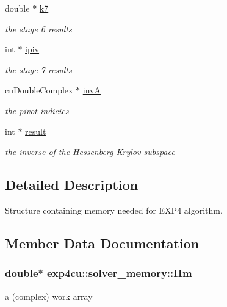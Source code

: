 \begin{DoxyCompactItemize}
double $\ast$ \hyperlink{structexp4cu_1_1solver__memory_aa2776a2d992080e4e4c3e557c26ba2f7}{k7}
\begin{DoxyCompactList}\small\item\em the stage 6 results \end{DoxyCompactList}\item 
int $\ast$ \hyperlink{structexp4cu_1_1solver__memory_a906f92c7521970bb4682737769d0b854}{ipiv}
\begin{DoxyCompactList}\small\item\em the stage 7 results \end{DoxyCompactList}\item 
cu\+Double\+Complex $\ast$ \hyperlink{structexp4cu_1_1solver__memory_a7e113949ec6861bbdf232d99badd8ed9}{invA}
\begin{DoxyCompactList}\small\item\em the pivot indicies \end{DoxyCompactList}\item 
int $\ast$ \hyperlink{structexp4cu_1_1solver__memory_aa0f66d6db2a4db2d779ff4dc407821b5}{result}
\begin{DoxyCompactList}\small\item\em the inverse of the Hessenberg Krylov subspace \end{DoxyCompactList}\end{DoxyCompactItemize}


\subsection{Detailed Description}
Structure containing memory needed for E\+X\+P4 algorithm. 

\subsection{Member Data Documentation}
\subsubsection[{\texorpdfstring{Hm}{Hm}}]{\setlength{\rightskip}{0pt plus 5cm}double$\ast$ exp4cu\+::solver\+\_\+memory\+::\+Hm}\hypertarget{structexp4cu_1_1solver__memory_aed9282a748435b4cc9e230bd92b9b91f}{}\label{structexp4cu_1_1solver__memory_aed9282a748435b4cc9e230bd92b9b91f}


a (complex) work array 

